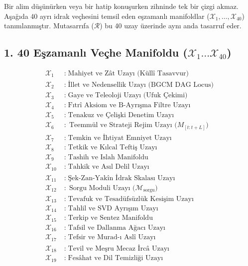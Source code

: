 \documentclass[11pt, a4paper]{article}
\begin{document}
Bir alim düşünürken veya bir hatip konuşurken zihninde tek bir çizgi akmaz. Aşağıda 40 ayrı idrak veçhesini temsil eden eşzamanlı manifoldlar ($\mathcal{X}_1, \dots, \mathcal{X}_{40}$) tanımlanmıştır. Mutasarrıfa ($\mathcal{R}$) bu 40 uzay üzerinde aynı anda tasarruf eder.

\subsection{1. 40 Eşzamanlı Veçhe Manifoldu ($\mathcal{X}_1 \dots \mathcal{X}_{40}$)}
\begin{align}
\mathcal{X}_1 \;&:\; \text{Mahiyet ve Zât Uzayı (Küllî Tasavvur)} \\
\mathcal{X}_2 \;&:\; \text{İllet ve Nedensellik Uzayı (BGCM DAG Locus)} \\
\mathcal{X}_3 \;&:\; \text{Gaye ve Teleoloji Uzayı (Ufuk Çekimi)} \\
\mathcal{X}_4 \;&:\; \text{Fıtrî Aksiom ve B-Ayrışma Filtre Uzayı} \\
\mathcal{X}_5 \;&:\; \text{Tenakuz ve Çelişki Denetim Uzayı} \\
\mathcal{X}_6 \;&:\; \text{Teemmül ve Strateji Rejim Uzayı ($M_{[t:t+L]}$)} \\
\mathcal{X}_7 \;&:\; \text{Temkin ve İhtiyat Emniyet Uzayı} \\
\mathcal{X}_8 \;&:\; \text{Tetkik ve Kılcal Teftiş Uzayı} \\
\mathcal{X}_9 \;&:\; \text{Tashih ve Islah Manifoldu} \\
\mathcal{X}_{10} \;&:\; \text{Tahkik ve Asıl Delil Uzayı} \\
\mathcal{X}_{11} \;&:\; \text{Şek-Zan-Yakîn İdrak Skalası Uzayı} \\
\mathcal{X}_{12} \;&:\; \text{Sorgu Moduli Uzayı ($\mathcal{M}_{\text{sorgu}}$)} \\
\mathcal{X}_{13} \;&:\; \text{Tevafuk ve Tesadüfsüzlük Kesişim Uzayı} \\
\mathcal{X}_{14} \;&:\; \text{Tahlil ve SVD Ayrışım Uzayı} \\
\mathcal{X}_{15} \;&:\; \text{Terkip ve Sentez Manifoldu} \\
\mathcal{X}_{16} \;&:\; \text{Tafsil ve Dallanma Ağacı Uzayı} \\
\mathcal{X}_{17} \;&:\; \text{Tefsir ve Murad-ı Aslî Uzayı} \\
\mathcal{X}_{18} \;&:\; \text{Tevil ve Meşru Mecaz İrcâ Uzayı} \\
\mathcal{X}_{19} \;&:\; \text{Fesâhat ve Dil Temizliği Uzayı} \\

\end{align}
\end{document}
